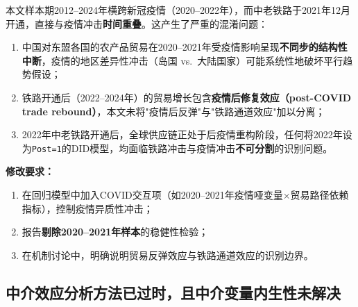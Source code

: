 \documentclass[12pt, a4paper]{article}
\begin{document}
\begin{majorbox}

本文样本期2012--2024年横跨新冠疫情（2020--2022年），而中老铁路于2021年12月开通，直接与疫情冲击\textbf{时间重叠}。这产生了严重的混淆问题：

\begin{enumerate}[label=\arabic*)]
  \item 中国对东盟各国的农产品贸易在2020--2021年受疫情影响呈现\textbf{不同步的结构性中断}，疫情的地区差异性冲击（岛国 vs.\ 大陆国家）可能系统性地破坏平行趋势假设；
  \item 铁路开通后（2022--2024年）的贸易增长包含\textbf{疫情后修复效应（post-COVID trade rebound）}，本文未将"疫情后反弹"与"铁路通道效应"加以分离；
  \item 2022年中老铁路开通后，全球供应链正处于后疫情重构阶段，任何将2022年设为\texttt{Post=1}的DID模型，均面临铁路冲击与疫情冲击\textbf{不可分割}的识别问题。
\end{enumerate}

\textbf{修改要求：}
\begin{enumerate}[label=(\alph*)]
  \item 在回归模型中加入COVID交互项（如2020--2021年疫情哑变量$\times$贸易路径依赖指标），控制疫情异质性冲击；
  \item 报告\textbf{剔除2020--2021年样本}的稳健性检验；
  \item 在机制讨论中，明确说明贸易反弹效应与铁路通道效应的识别边界。
\end{enumerate}
\end{majorbox}

\subsection{中介效应分析方法已过时，且中介变量内生性未解决}
\label{sec:mediation}
\end{document}
